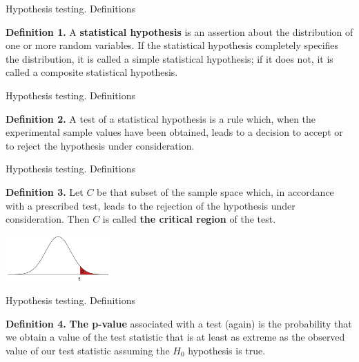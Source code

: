 \documentclass{beamer}
\begin{document}
\begin{frame}
{\centerline{Hypothesis testing. Definitions}}
\textbf{Definition 1.} A \textbf{ statistical hypothesis} is an assertion about the distribution of one or more random variables. If the statistical hypothesis completely specifies the distribution, it is called a simple statistical hypothesis; if it does not, it is called a composite statistical hypothesis.

\end{frame}

\begin{frame}
{\centerline{Hypothesis testing. Definitions}}

\textbf{Definition 2.} A test of a statistical hypothesis is a rule which, when the experimental sample values have been obtained, leads to a decision to accept or to reject the hypothesis under consideration.

\end{frame}


\begin{frame}
{\centerline{Hypothesis testing. Definitions}}
\textbf{Definition 3.} Let $C$ be that subset of the sample space which, in accordance with a prescribed test, leads to the rejection of the hypothesis under consideration. Then $C$ is called \textbf{the critical region} of the test.

\begin{center}
\includegraphics[width=4cm]{A2022.IDSEPC.SperimentazioneDeduzione/norm-hypo.png}
\end{center}

\end{frame}



\begin{frame}
{\centerline{Hypothesis testing. Definitions}}



\textbf{Definition 4.} \textbf{The p-value} associated with a test (again) is the probability that we obtain a value of the test statistic that is at least as extreme as the observed value of our test statistic assuming the $H_0$ hypothesis is true.
\end{frame}
\end{document}
